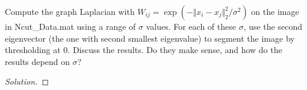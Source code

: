 \documentclass[10pt]{article}
\newenvironment{problem}[2][]{\begin{trivlist}
\item[\hskip \labelsep {\bfseries #1}\hskip \labelsep {\bfseries #2.}]}{\end{trivlist}}
\begin{document}
\begin{problem}{Question 3}

Compute the graph Laplacian with $W_{ij} = \exp(-\Vert x_i - x_j \Vert_2^2/ \sigma^2)$ on the image in Ncut\_Data.mat using a range of $\sigma$ values. For each of these $\sigma$, use the second eigenvector (the one with second smallest eigenvalue) to segment the image by thresholding at $0$. Discuss the results. Do they make sense, and how do the results depend on $\sigma$?

\end{problem}

\begin{proof}[Solution]


\end{proof}
\end{document}
